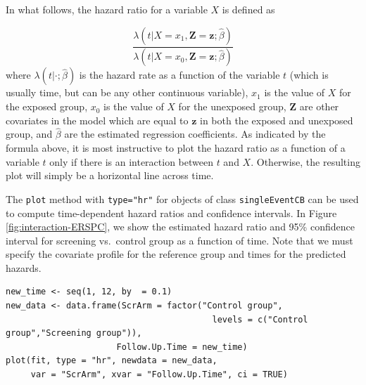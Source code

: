 In what follows, the hazard ratio for a variable \(X\) is defined as

\[
\frac{\lambda\left(t | X=x_1, \mathbf{Z}=\mathbf{z} ; \widehat{\beta}\right)}{\lambda(t | X=x_0, \mathbf{Z}=\mathbf{z} ; \widehat{\beta})}
\]
where \(\lambda(t|\cdot;\widehat{\beta})\) is the hazard rate as a function of the
variable \(t\) (which is usually time, but can be any other continuous variable),
\(x_1\) is the value of \(X\) for the exposed group, \(x_0\) is the value of \(X\) for
the unexposed group, \(\mathbf{Z}\) are other covariates in the model which are
equal to \(\mathbf{z}\) in both the exposed and unexposed group,
and \(\widehat{\beta}\) are the estimated regression coefficients. As indicated by the
formula above, it is most instructive to plot the hazard ratio as a function of
a variable \(t\) only if there is an interaction between \(t\) and \(X\). Otherwise,
the resulting plot will simply be a horizontal line across time.

The \texttt{plot} method with \texttt{type="hr"} for objects of class
\texttt{singleEventCB} can be used to compute time-dependent hazard ratios and
confidence intervals. In Figure \ref{fig:interaction-ERSPC}, we show the
estimated hazard ratio and 95\% confidence interval for screening vs.~control
group as a function of time. Note that we must specify the covariate profile for
the reference group and times for the predicted hazards.

\begin{verbatim}
new_time <- seq(1, 12, by  = 0.1)
new_data <- data.frame(ScrArm = factor("Control group",
                                         levels = c("Control group","Screening group")),
                      Follow.Up.Time = new_time)
plot(fit, type = "hr", newdata = new_data,
     var = "ScrArm", xvar = "Follow.Up.Time", ci = TRUE)
\end{verbatim}

